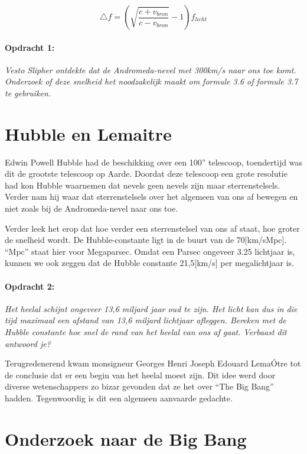 \begin{equation}
\triangle f=\left(\sqrt{\frac{c+v_{bron}}{c-v_{bron}}}-1\right)f_{licht}
\end{equation}


\paragraph*{Opdracht 1:}

\emph{Vesto Slipher ontdekte dat de Andromeda-nevel met 300km/s naar
ons toe komt. Onderzoek of deze snelheid het noodzakelijk maakt om
formule 3.6 of formule 3.7 te gebruiken.}


\section{Hubble en Lemaitre}

Edwin Powell Hubble had de beschikking over een 100'' telescoop,
toendertijd was dit de grootste telescoop op Aarde. Doordat deze telescoop
een grote resolutie had kon Hubble waarnemen dat nevels geen nevels
zijn maar sterrenstelsels. Verder nam hij waar dat sterrenstelsels
over het algemeen van ons af bewegen en niet zoals bij de Andromeda-nevel
naar ons toe. 

Verder leek het erop dat hoe verder een sterrenstelsel van ons af
staat, hoe groter de snelheid wordt. De Hubble-constante ligt in de
buurt van de 70{[}km/sMpc{]}. ``Mpc'' staat hier voor Megaparsec.
Omdat een Parsec ongeveer 3.25 lichtjaar is, kunnen we ook zeggen
dat de Hubble constante 21,5{[}km/s{]} per megalichtjaar is.


\paragraph*{Opdracht 2:}

\emph{Het heelal schijnt ongeveer 13,6 miljard jaar oud te zijn. Het
licht kan dus in die tijd maximaal een afstand van 13,6 miljard lichtjaar
afleggen. Bereken met de Hubble constante hoe snel de rand van het
heelal van ons af gaat. Verbaast dit antwoord je?}

Terugredenerend kwam monsigneur Georges Henri Joseph Edouard LemaÓtre
tot de conclusie dat er een begin van het heelal moest zijn. Dit idee
werd door diverse wetenschappers zo bizar gevonden dat ze het over
``The Big Bang'' hadden. Tegenwoordig is dit een algemeen aanvaarde
gedachte.


\section{Onderzoek naar de Big Bang}

